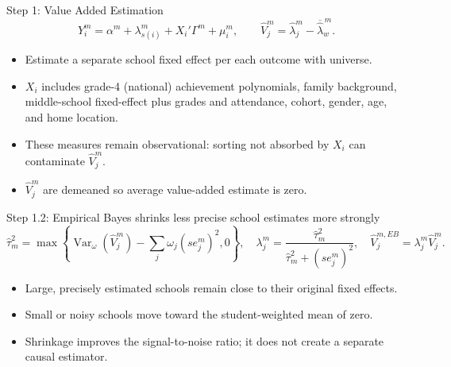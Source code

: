 \documentclass[11pt,aspectratio=169]{beamer}
\let\oldparencite\parencite
\renewcommand{\parencite}[2][]{%
  \footnotesize {\tiny \oldparencite[#1]{#2}} \normalsize%
}
\newenvironment{wideitemize}{%
  \begin{minipage}{0.92\textwidth}
  \begin{itemize}
  \addtolength{\itemsep}{0.75em}
}{%
  \end{itemize}
  \end{minipage}
}
\begin{document}
\begin{frame}{Step 1: Value Added Estimation}
\small
\[
Y_i^m
=
\alpha^m
+\lambda_{s(i)}^m
+X_i'\Gamma^m
+\mu_i^m,
\qquad
\widehat V_j^m=\widehat\lambda_j^m-\overline{\widehat\lambda}^{\,m}_{w}.
\]

\begin{wideitemize}
  \item Estimate a separate school fixed effect per each outcome with universe.
  \item $X_i$ includes grade-4 (national) achievement polynomials, family background, middle-school fixed-effect plus grades and attendance, cohort, gender, age, and home location.
  \item These measures remain observational: sorting not absorbed by $X_i$ can contaminate $\widehat V_j^m$.
  \item  $\widehat V_j^m$ are demeaned so average value-added estimate is zero.
\end{wideitemize}
\end{frame}

\begin{frame}{Step 1.2: Empirical Bayes shrinks less precise school estimates more strongly}
\small
\[
\widehat\tau_m^2
=
\max\left\{
\operatorname{Var}_{\omega}(\widehat V_j^m)
-\sum_j\omega_j(se_j^m)^2,
0
\right\},
\quad
\lambda_j^m
=
\frac{\widehat\tau_m^2}{\widehat\tau_m^2+(se_j^m)^2},
\quad
\widehat V_j^{m,EB}=\lambda_j^m\widehat V_j^m.
\]

\begin{wideitemize}
  \item Large, precisely estimated schools remain close to their original fixed effects.
  \item Small or noisy schools move toward the student-weighted mean of zero. \parencite{walters_chapter_2024}
  \item Shrinkage improves the signal-to-noise ratio; it does not create a separate causal estimator.
\end{wideitemize}
\end{frame}
\end{document}
